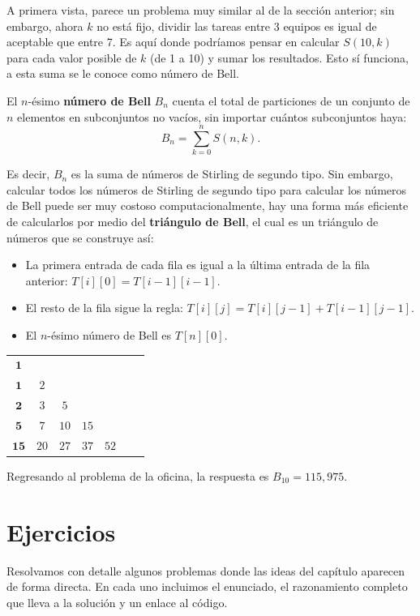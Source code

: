 A primera vista, parece un problema muy similar al de la sección anterior; sin embargo, ahora $k$ no está fijo, dividir las tareas entre 3 equipos es igual de aceptable que entre 7. Es aquí donde podríamos pensar en calcular $S(10,k)$ para cada valor posible de $k$ (de 1 a 10) y sumar los resultados. Esto sí funciona, a esta suma se le conoce como número de Bell.

El $n$-ésimo \textbf{número de Bell} $B_n$ cuenta el total de particiones de un conjunto de $n$ elementos en subconjuntos no vacíos, sin importar cuántos subconjuntos haya:
\[
B_n = \sum_{k=0}^{n} S(n,k).
\]

Es decir, $B_n$ es la suma de números de Stirling de segundo tipo. Sin embargo, calcular todos los números de Stirling de segundo tipo para calcular los números de Bell puede ser muy costoso computacionalmente, hay una forma más eficiente de calcularlos por medio del \textbf{triángulo de Bell}, el cual es un triángulo de números que se construye así:
\begin{itemize}
    \item La primera entrada de cada fila es igual a la última entrada de la fila anterior: $T[i][0] = T[i-1][i-1]$.
    \item El resto de la fila sigue la regla: $T[i][j] = T[i][j-1] + T[i-1][j-1]$.
    \item El $n$-ésimo número de Bell es $T[n][0]$.
\end{itemize}
 
\begin{center}
\begin{tabular}{ccccccc}
$\mathbf{1}$ \\
$\mathbf{1}$ & $2$ \\
$\mathbf{2}$ & $3$ & $5$ \\
$\mathbf{5}$ & $7$ & $10$ & $15$ \\
$\mathbf{15}$ & $20$ & $27$ & $37$ & $52$ \\
\end{tabular}
\end{center}

Regresando al problema de la oficina, la respuesta es $B_{10}=115,975$.

\section{Ejercicios}

Resolvamos con detalle algunos problemas donde las ideas del capítulo aparecen de forma directa. En cada uno incluimos el enunciado, el razonamiento completo que lleva a la solución y un enlace al código.

